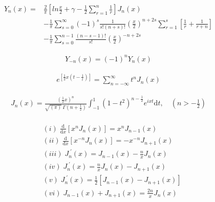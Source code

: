 \[\begin{align} \label{thrm4.3} Y_n(x) = & \frac2\pi\left[ ln\frac x2 + \gamma -\frac 12 \sum_{r=1}^n\frac 1r \right]J_n(x) \\\ & -\frac 1\pi\sum_{s=0}^\infty (-1)^s\frac{1}{s!(n+s)!}\left( \frac x2 \right) ^{n+2s}\sum_{r=1}^s\left[ \frac 1r + \frac 1{r+n} \right] \\\ & - \frac 1\pi \sum_{s=0}^{n-1}\frac{(n-s-1)!}{s!}\left( \frac x2 \right)^{-n+2s} \end{align}\]

\[\begin{align} \label{thrm4.4} Y_{-n}(x) = (-1)^nY_n(x) \end{align}\]

\[\begin{align} \label{thrm4.5} e^{\left[ \frac 12x(t-\frac 1t) \right]} = \sum_{n= -\infty}^{\infty}t^nJ_n(x) \end{align}\]

\[\begin{align} \label{thrm4.7} J_n(x) = \frac{(\tfrac 12x)^n}{\sqrt{(\pi)}\, \Gamma(n+\tfrac 12)}\int_{-1}^1(1-t^2)^{n- \tfrac 12}e^{ixt}\mathrm dt,\quad (n>-\tfrac 12) \end{align}\]

\[\begin{align} \label{thrm4.8} \\\ & (i)\; \frac{\mathrm d}{\mathrm dx}\left[ x^nJ_n(x) \right] = x^nJ_{n-1}(x) \\\ & (ii)\; \frac{\mathrm d}{\mathrm dx}\left[ x^{-n}J_n(x) \right] = -x^{-n}J_{n+1}(x) \\\ & (iii)\; J_n^{\; '}(x) = J_{n-1}(x) - \frac nxJ_n(x) \\\ & (iv)\; J_n^{\; '}(x) =\frac nxJ_n(x) - J_{n+1}(x) \\\ & (v)\; J_n^{\; '}(x) = \tfrac 12 \left[J_{n-1}(x) - J_{n+1}(x) \right] \\\ & (vi)\; J_{n-1}(x) + J_{n+1}(x) = \frac {2n}xJ_n(x) \end{align}\]

